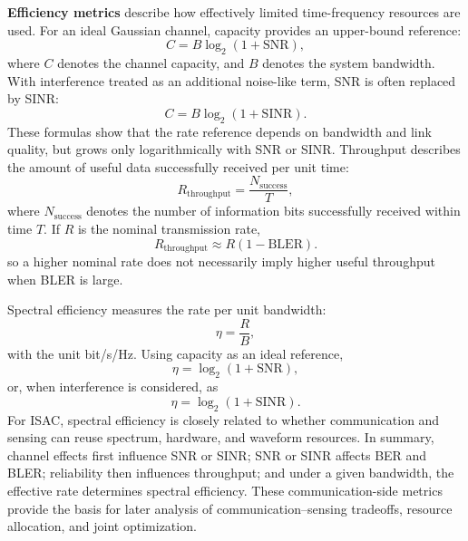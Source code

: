 \textbf{Efficiency metrics} describe how effectively limited time-frequency
resources are used.
For an ideal Gaussian channel, capacity provides an upper-bound reference:
\begin{equation}
    C
    =
    B \log_2
    \left(
        1+\mathrm{SNR}
    \right),
    \label{eq:capacity-snr}
\end{equation}
where
\(C\) denotes the channel capacity,
and \(B\) denotes the system bandwidth.
With interference treated as an additional noise-like term, SNR is often
replaced by SINR:
\begin{equation}
    C
    =
    B \log_2
    \left(
        1+\mathrm{SINR}
    \right).
    \label{eq:capacity-sinr}
\end{equation}
These formulas show that the rate reference depends on bandwidth and link
quality, but grows only logarithmically with SNR or SINR.
Throughput describes the amount of useful data successfully received per unit
time:
\begin{equation}
    R_{\mathrm{throughput}}
    =
    \frac{N_{\mathrm{success}}}{T},
    \label{eq:throughput-definition}
\end{equation}
where
\(N_{\mathrm{success}}\) denotes the number of information bits successfully received within time \(T\).
If \(R\) is the nominal transmission rate,
\begin{equation}
    R_{\mathrm{throughput}}
    \approx
    R
    \left(
        1-\mathrm{BLER}
    \right).
    \label{eq:throughput-bler}
\end{equation}
so a higher nominal rate does not necessarily imply higher useful throughput
when BLER is large.

Spectral efficiency measures the rate per unit bandwidth:
\begin{equation}
    \eta
    =
    \frac{R}{B},
    \label{eq:spectral-efficiency-definition}
\end{equation}
with the unit bit/s/Hz.
Using capacity as an ideal reference,
\begin{equation}
    \eta
    =
    \log_2
    \left(
        1+\mathrm{SNR}
    \right),
    \label{eq:spectral-efficiency-snr}
\end{equation}
or,
when interference is considered,
as
\begin{equation}
    \eta
    =
    \log_2
    \left(
        1+\mathrm{SINR}
    \right).
    \label{eq:spectral-efficiency-sinr}
\end{equation}
For ISAC, spectral efficiency is closely related to whether communication and
sensing can reuse spectrum, hardware, and waveform resources.
In summary, channel effects first influence SNR or SINR; SNR or SINR affects
BER and BLER; reliability then influences throughput; and under a given
bandwidth, the effective rate determines spectral efficiency.
These communication-side metrics provide the basis for later analysis of
communication--sensing tradeoffs, resource allocation, and joint optimization.

